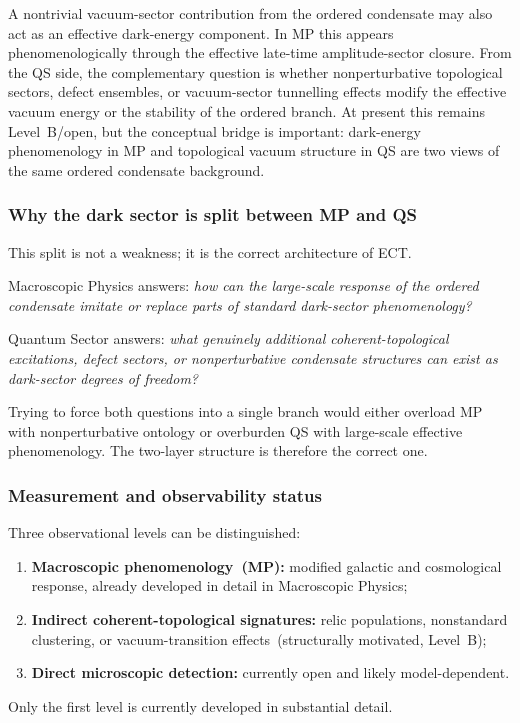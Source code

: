 \documentclass[11pt,a4paper]{article}
\numberwithin{equation}{section}
\begin{document}
A nontrivial vacuum-sector contribution from the ordered condensate
may also act as an effective dark-energy component.
In MP this appears phenomenologically through the effective late-time
amplitude-sector closure.
From the QS side, the complementary question is whether nonperturbative
topological sectors, defect ensembles, or vacuum-sector tunnelling
effects modify the effective vacuum energy or the stability of the
ordered branch.
At present this remains Level~B/open, but the conceptual bridge is
important: dark-energy phenomenology in MP and topological vacuum
structure in QS are two views of the same ordered condensate background.

\subsubsection*{Why the dark sector is split between MP and QS}

This split is not a weakness; it is the correct architecture of ECT.

Macroscopic Physics answers: \emph{how can the large-scale response of
the ordered condensate imitate or replace parts of standard dark-sector
phenomenology?}

Quantum Sector answers: \emph{what genuinely additional
coherent-topological excitations, defect sectors, or nonperturbative
condensate structures can exist as dark-sector degrees of freedom?}

Trying to force both questions into a single branch would either
overload MP with nonperturbative ontology or overburden QS with
large-scale effective phenomenology.
The two-layer structure is therefore the correct one.

\subsubsection*{Measurement and observability status}

Three observational levels can be distinguished:
\begin{enumerate}[label=(\roman*)]
  \item \textbf{Macroscopic phenomenology~(MP):}
    modified galactic and cosmological response, already developed in
    detail in Macroscopic Physics;
  \item \textbf{Indirect coherent-topological signatures:}
    relic populations, nonstandard clustering, or vacuum-transition
    effects~(structurally motivated, Level~B);
  \item \textbf{Direct microscopic detection:}
    currently open and likely model-dependent.
\end{enumerate}
Only the first level is currently developed in substantial detail.
\end{document}
